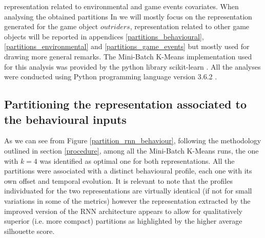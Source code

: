 representation related to environmental and game events covariates. When analysing the obtained partitions In we will mostly focus on the representation generated for the game object $outriders$, representation related to other game objects will be reported in appendices \ref{partitions_behavioural}, \ref{partitions_environmental} and \ref{partitions_game_events} but mostly used for drawing more general remarks. The Mini-Batch K-Means implementation used for this analysis was provided by the python library scikit-learn \cite{scikit-learn}. All the analyses were conducted using Python programming language version 3.6.2 \cite{10.5555/1593511}.

\subsection{Partitioning the representation associated to the behavioural inputs}
\label{partition_behaviour}
As we can see from Figure \ref{partition_rnn_behaviour}, following the methodology outlined in section \ref{procedure}, among all the Mini-Batch K-Means runs, the one with $k=4$ was identified as optimal one for both representations. All the partitions were associated with a distinct behavioural profile, each one with its own offset and temporal evolution. It is relevant to note that the profiles individuated for the two representations are virtually identical (if not for small variations in some of the metrics) however the representation extracted by the improved version of the RNN architecture appears to allow for qualitatively superior (i.e. more compact) partitions as highlighted by the higher average silhouette score.
